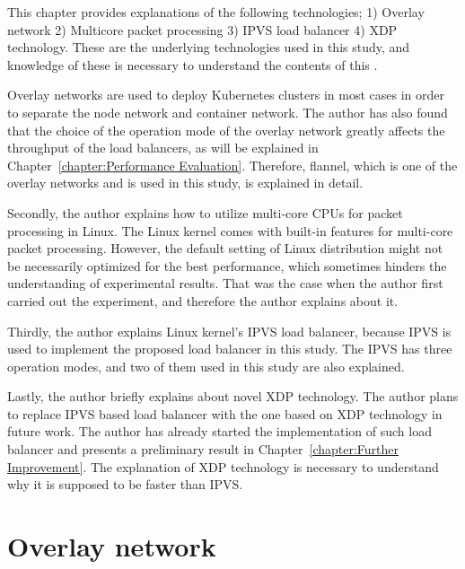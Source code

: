 

  This chapter provides explanations of the following technologies;
  1) Overlay network
  2) Multicore packet processing
  3) IPVS load balancer
  4) XDP technology.
  These are the underlying technologies used in this study, and knowledge of these is necessary to understand the contents of this .





Overlay networks are used to deploy Kubernetes clusters in most cases in order to separate the node network and container network.
The author has also found that the choice of the operation mode of the overlay network greatly affects the throughput of the load balancers, as will be explained in Chapter~\ref{chapter:Performance Evaluation}.
Therefore, flannel, which is one of the overlay networks and is used in this study, is explained in detail.

Secondly, the author explains how to utilize multi-core CPUs for packet processing in Linux.
The Linux kernel comes with built-in features for multi-core packet processing.
However, the default setting of Linux distribution might not be necessarily optimized for the best performance, which sometimes hinders the understanding of experimental results.
That was the case when the author first carried out the experiment, and therefore the author explains about it.

Thirdly, the author explains Linux kernel's IPVS load balancer, because IPVS is used to implement the proposed load balancer in this study.
The IPVS has three operation modes, and two of them used in this study are also explained.

Lastly, the author briefly explains about novel XDP technology.
The author plans to replace IPVS based load balancer with the one based on XDP technology in future work.
The author has already started the implementation of such load balancer and presents a preliminary result in Chapter~\ref{chapter:Further Improvement}.
The explanation of XDP technology is necessary to understand why it is supposed to be faster than IPVS.


\section{Overlay network}


